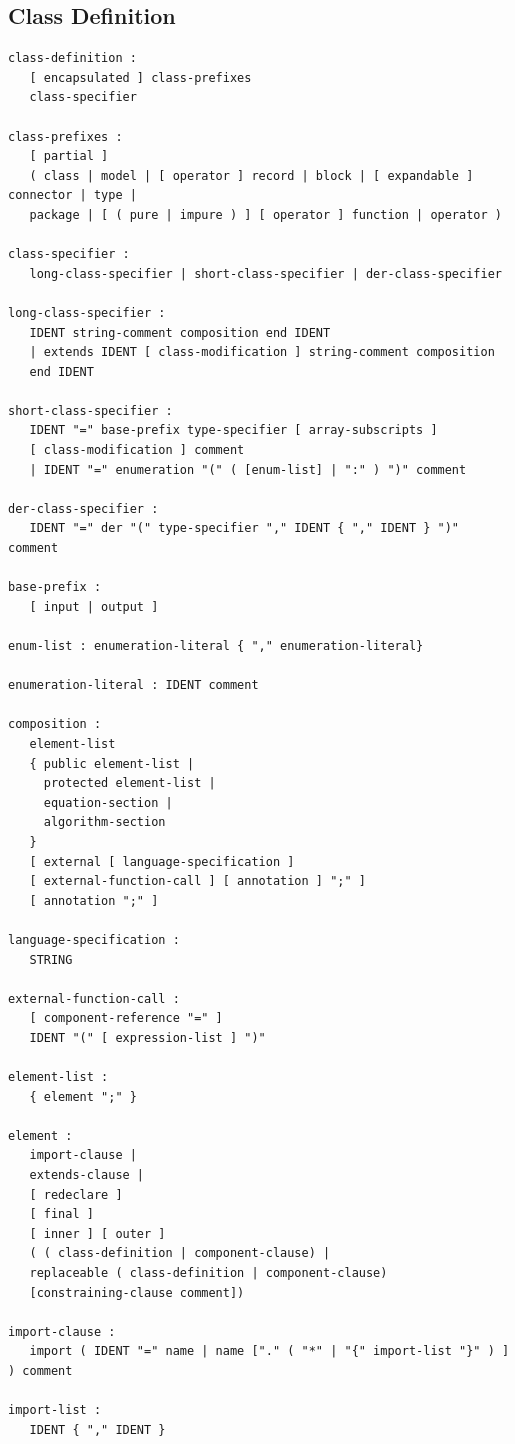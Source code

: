 \documentclass[10pt,a4paper]{report}
\def\doublelabel#1{\label{#1}}
\begin{document}
\subsection{Class Definition}\doublelabel{class-definition}
\begin{lstlisting}[language=grammar]
class-definition :
   [ encapsulated ] class-prefixes
   class-specifier

class-prefixes :
   [ partial ]
   ( class | model | [ operator ] record | block | [ expandable ] connector | type |
   package | [ ( pure | impure ) ] [ operator ] function | operator )

class-specifier :
   long-class-specifier | short-class-specifier | der-class-specifier

long-class-specifier :
   IDENT string-comment composition end IDENT
   | extends IDENT [ class-modification ] string-comment composition
   end IDENT

short-class-specifier :
   IDENT "=" base-prefix type-specifier [ array-subscripts ]
   [ class-modification ] comment
   | IDENT "=" enumeration "(" ( [enum-list] | ":" ) ")" comment

der-class-specifier :
   IDENT "=" der "(" type-specifier "," IDENT { "," IDENT } ")" comment
   
base-prefix :
   [ input | output ]
   
enum-list : enumeration-literal { "," enumeration-literal}

enumeration-literal : IDENT comment

composition :
   element-list
   { public element-list |
     protected element-list |
     equation-section |
     algorithm-section
   }
   [ external [ language-specification ]
   [ external-function-call ] [ annotation ] ";" ]
   [ annotation ";" ]

language-specification :
   STRING
   
external-function-call :
   [ component-reference "=" ]
   IDENT "(" [ expression-list ] ")"

element-list :
   { element ";" }

element :
   import-clause |
   extends-clause |
   [ redeclare ]
   [ final ]
   [ inner ] [ outer ]
   ( ( class-definition | component-clause) |
   replaceable ( class-definition | component-clause)
   [constraining-clause comment])

import-clause :
   import ( IDENT "=" name | name ["." ( "*" | "{" import-list "}" ) ] ) comment

import-list :
   IDENT { "," IDENT }
\end{lstlisting}
\end{document}
